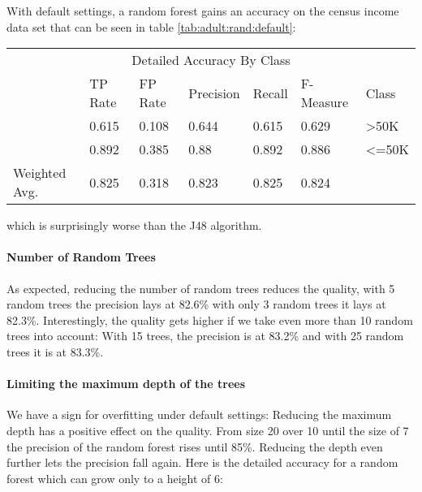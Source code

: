 \documentclass[paper=a4, fontsize=11pt]{scrartcl} %
\numberwithin{equation}{section} %
\numberwithin{figure}{section} %
\numberwithin{table}{section} %
\begin{document}
With default settings, a random forest gains an accuracy on the census income data set that can be seen in table \ref{tab:adult:rand:default}:
\begin{table*}[htb]\centering
  \begin{tabular*}{\columnwidth}{@{}lllllll@{}}
      \toprule 
      \multicolumn{7}{c}{Detailed Accuracy By Class} \\ 
              &  TP Rate & FP Rate & Precision & Recall & F-Measure & Class    \\  \midrule
              &  0.615   & 0.108   & 0.644     & 0.615  & 0.629     & >50K     \\     
              &  0.892   & 0.385   & 0.88      & 0.892  & 0.886     & <=50K    \\ 
Weighted Avg. &  0.825   & 0.318   & 0.823     & 0.825  & 0.824     &          \\ \bottomrule
    \end{tabular*}
\caption{Random Forest -- Default Settings} 
\label{tab:adult:rand:default}
\end{table*}
\FloatBarrier
which is surprisingly worse than the J48 algorithm. 

\paragraph{Number of Random Trees}
As expected, reducing the number of random trees reduces the quality, with 5 random trees the precision lays at 82.6\% with only 3 random trees it lays at 82.3\%. Interestingly, the quality gets higher if we take even more than 10 random trees into account: With 15 trees, the precision is at 83.2\% and with 25 random trees it is at 83.3\%.

\paragraph{Limiting the maximum depth of the trees}
We have a sign for overfitting under default settings: Reducing the maximum depth has a positive effect on the quality. From size 20 over 10 until the size of 7 the precision of the random forest rises until 85\%. Reducing the depth even further lets the precision fall again. Here is the detailed accuracy for a random forest which can grow only to a height of 6:
\end{document}

